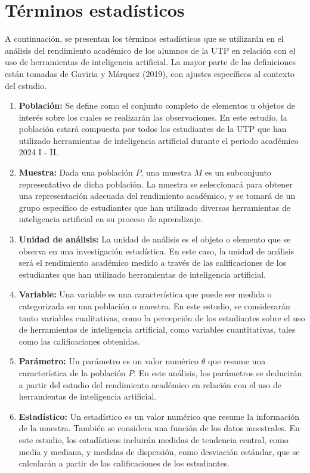 \section{Términos estadísticos}

  A continuación, se presentan los términos estadísticos que se utilizarán en el análisis del rendimiento académico de los alumnos de la UTP en relación con el uso de herramientas de inteligencia artificial. La mayor parte de las definiciones están tomadas de Gaviria y Márquez (2019), con ajustes específicos al contexto del estudio.
  
  \begin{enumerate}
    \item \textbf{Población:} Se define como el conjunto completo de elementos u objetos de interés sobre los cuales se realizarán las observaciones. En este estudio, la población estará compuesta por todos los estudiantes de la UTP que han utilizado herramientas de inteligencia artificial durante el periodo académico 2024 I - II.
  
    \item \textbf{Muestra:} Dada una población $P$, una muestra $M$ es un subconjunto representativo de dicha población. La muestra se seleccionará para obtener una representación adecuada del rendimiento académico, y se tomará de un grupo específico de estudiantes que han utilizado diversas herramientas de inteligencia artificial en su proceso de aprendizaje.
  
    \item \textbf{Unidad de análisis:} La unidad de análisis es el objeto o elemento que se observa en una investigación estadística. En este caso, la unidad de análisis será el rendimiento académico medido a través de las calificaciones de los estudiantes que han utilizado herramientas de inteligencia artificial.
  
    \item \textbf{Variable:} Una variable es una característica que puede ser medida o categorizada en una población o muestra. En este estudio, se considerarán tanto variables cualitativas, como la percepción de los estudiantes sobre el uso de herramientas de inteligencia artificial, como variables cuantitativas, tales como las calificaciones obtenidas.
  
    \item \textbf{Parámetro:} Un parámetro es un valor numérico $\theta$ que resume una característica de la población $P$. En este análisis, los parámetros se deducirán a partir del estudio del rendimiento académico en relación con el uso de herramientas de inteligencia artificial.
  
    \item \textbf{Estadístico:} Un estadístico es un valor numérico que resume la información de la muestra. También se considera una función de los datos muestrales. En este estudio, los estadísticos incluirán medidas de tendencia central, como media y mediana, y medidas de dispersión, como desviación estándar, que se calcularán a partir de las calificaciones de los estudiantes.
\end{enumerate}